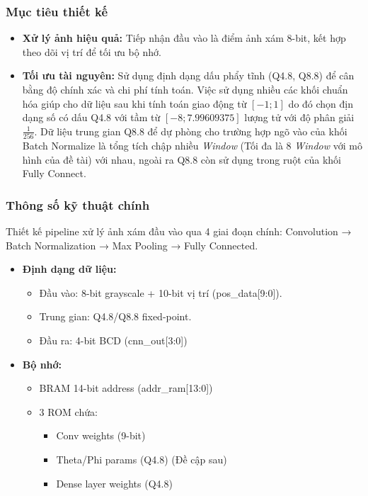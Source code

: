 \subsubsection{Mục tiêu thiết kế}
\begin{itemize}
    \item \textbf{Xử lý ảnh hiệu quả:} Tiếp nhận đầu vào là điểm ảnh xám 8-bit, kết hợp theo dõi vị trí để tối ưu bộ nhớ.
    \item \textbf{Tối ưu tài nguyên:} Sử dụng định dạng dấu phẩy tĩnh (Q4.8, Q8.8) để cân bằng độ chính xác và chi phí tính toán. Việc sử dụng nhiều các khối chuẩn hóa giúp cho dữ liệu sau khi tính toán giao động từ $[-1; 1]$ do đó chọn địn dạng số có dấu Q4.8 với tầm từ $[-8; 7.99609375]$ lượng tử với độ phân giải $\frac{1}{256}$. Dữ liệu trung gian Q8.8 để dự phòng cho trường hợp ngõ vào của khối Batch Normalize là tổng tích chập nhiều \textit{Window} (Tối đa là 8 \textit{Window} với mô hình của đề tài) với nhau, ngoài ra Q8.8 còn sử dụng trong ruột của khối Fully Connect.
\end{itemize}

\subsubsection{Thông số kỹ thuật chính}

Thiết kế pipeline xử lý ảnh xám đầu vào qua 4 giai đoạn chính: Convolution → Batch Normalization → Max Pooling → Fully Connected.

\begin{itemize}
    \item \textbf{Định dạng dữ liệu:}
    \begin{itemize}
        \item Đầu vào: 8-bit grayscale + 10-bit vị trí (pos\_data[9:0]).
        \item Trung gian: Q4.8/Q8.8 fixed-point.
        \item Đầu ra: 4-bit BCD (cnn\_out[3:0])
    \end{itemize}

    \item \textbf{Bộ nhớ:}
    \begin{itemize}
        \item BRAM 14-bit address (addr\_ram[13:0])
        \item 3 ROM chứa:
        \begin{itemize}
            \item Conv weights (9-bit)
            \item Theta/Phi params (Q4.8) (Đề cập sau)
            \item Dense layer weights (Q4.8)
        \end{itemize}
    \end{itemize}

\end{itemize}

